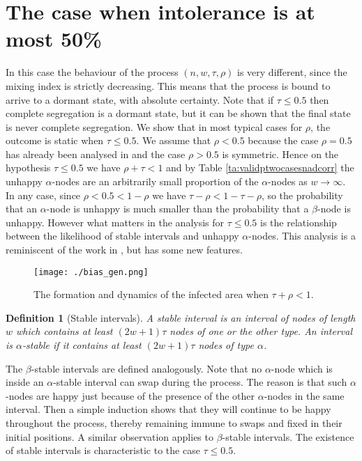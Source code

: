 \documentclass[11pt]{article}
\theoremstyle{plain}
\newtheorem{defi}[thm]{Definition}
\numberwithin{equation}{subsection}
\begin{document}
\section{The case 
when intolerance is at most 50\%}\label{se:casetaubhalf}
In this case the behaviour of the process $(n,w,\tau,\rho)$ is very different, since
the mixing index is strictly decreasing. This means that
the process is bound to arrive to a dormant state, with absolute certainty.
Note that if $\tau\leq 0.5$ then complete segregation is a dormant state, but it can be shown that the final state
is never complete segregation. 
We show
that in most typical cases for $\rho$,  the outcome is static when $\tau\leq 0.5$.
We assume that $\rho<0.5$ because the case
$\rho=0.5$ has already been analysed in \cite{brandt:an, BELschel13} 
and the 
case $\rho >0.5$ is symmetric. Hence on the hypothesis $\tau\leq 0.5$ we have
$\rho + \tau <1$ and by Table \ref{ta:validptwocasesnadcorr}
the unhappy $\alpha$-nodes are an arbitrarily small
proportion of the $\alpha$-nodes as $w\to\infty$.
In any case, since $\rho<0.5<1-\rho$
we have $\tau-\rho< 1-\tau -\rho$, 
so the probability that an $\alpha$-node is unhappy is much smaller
than the probability that a $\beta$-node is unhappy.
However what matters in the analysis for $\tau\leq 0.5$ is the relationship between
the likelihood of stable intervals and unhappy $\alpha$-nodes. This analysis is 
a reminiscent of the work in 
\cite{BELschel13}, but has some new features. 

\begin{figure} 
\centering\texttt{[image: ./bias\_gen.png]}
\caption{The formation and dynamics of the infected area when $\tau+\rho<1$. }\label{fig:biasplot}
\end{figure}   

\begin{defi}[Stable intervals]
A stable interval is
an interval of nodes of length $w$ which contains at least $(2w+1)\tau$ nodes of one 
or the other type. 
An interval is $\alpha$-stable if it contains at least $(2w+1)\tau$ nodes
of type $\alpha$.\end{defi}

The $\beta$-stable intervals are defined analogously.
Note that no $\alpha$-node which is inside 
an $\alpha$-stable interval can swap during the process.
The reason is that such $\alpha$-nodes are 
happy just because of the presence of the other $\alpha$-nodes
 in the same interval. Then a simple induction shows 
 that they will continue to be happy throughout the process,
 thereby remaining  immune to swaps and fixed in their initial positions.
A similar observation  applies to $\beta$-stable intervals. 
The existence of stable intervals is characteristic to the case $\tau\leq 0.5$.
\end{document}
